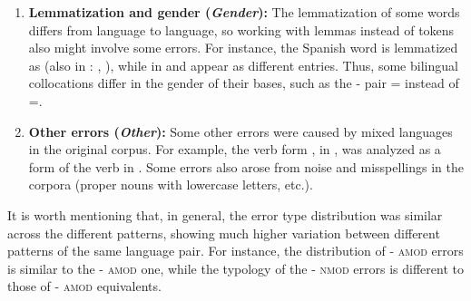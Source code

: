 \documentclass[output=paper,modfonts,nonflat]{langsci/langscibook}
\begin{document}
\begin{enumerate}
\item \textbf{Lemmatization and gender (\textit{Gender}):} The lemmatization of some words
  differs from language to language, so working with lemmas instead of
  tokens also might involve some errors. For instance, the Spanish word
   is lemmatized as 
  (also in : , ), while in  
  and  appear as different entries. Thus, some bilingual
  collocations differ in the gender of their bases, such as the
  - pair  =  instead of =.

\item \textbf{Other errors (\textit{Other}):} Some other errors were caused by mixed languages
  in the original corpus. For example, the verb form , in , was analyzed
  as a form of the verb  in . Some errors also arose from noise
  and misspellings in the corpora (proper nouns with lowercase letters, etc.).
\end{enumerate}

It is worth mentioning that, in general, the error type distribution was similar across
the different  patterns, showing much higher variation between different patterns
of the same language pair. For instance, the distribution of - \textsc{amod} errors
is similar to the - \textsc{amod} one, while the typology of the - \textsc{nmod}
errors is different to those of - \textsc{amod} equivalents.
\end{document}
